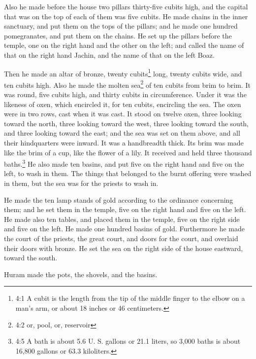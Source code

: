 \myverse{}Also he made before the house two pillars thirty-five cubits
high, and the capital that was on the top of each of them was five cubits.
\myverse{}He made chains in the inner sanctuary, and put them on the tops of the pillars;
and he made one hundred pomegranates, and put them on the chains.
\myverse{}He set up the pillars before the temple, one on the right hand and the other
on the left; and called the name of that on the right hand Jachin, and the name of that on the left Boaz.


\mychapter{} \myverse*{}Then he made an altar of bronze, twenty cubits\footnote{4:1 A cubit is the length from the tip of the middle finger to the elbow on a man’s arm, or about
	18 inches or 46 centimeters.} long, twenty cubits wide, and ten cubits high.
\myverse{}Also he made the molten sea\footnote{4:2 or, pool, or, reservoir} of ten cubits from brim to brim. It was round, five cubits high,
and thirty cubits in circumference.
\myverse{}Under it was the likeness of oxen, which encircled it, for ten cubits, encircling
the sea. The oxen were in two rows, cast when it was cast.
\myverse{}It stood on twelve oxen, three looking toward the north, three looking toward
the west, three looking toward the south, and three looking toward the east; and the sea was set on them
above, and all their hindquarters were inward.
\myverse{}It was a handbreadth thick. Its brim was made like the brim of a cup, like the
flower of a lily. It received and held three thousand baths.\footnote{4:5 A bath is about 5.6 U. S. gallons or 21.1 liters, so 3,000 baths is about 16,800 gallons or 63.3
	kiloliters.}
\myverse{}He also made ten basins, and put five on the right hand and five on the left,
to wash in them. The things that belonged to the burnt offering were washed in them, but the sea was for
the priests to wash in.

\myverse{}He made the ten lamp stands of gold according to the ordinance
concerning them; and he set them in the temple, five on the right hand and five on the left.
\myverse{}He made also ten tables, and placed them in the temple, five on the right side
and five on the left. He made one hundred basins of gold.
\myverse{}Furthermore he made the court of the priests, the great court, and doors for
the court, and overlaid their doors with bronze.
\myverse{}He set the sea on the right side of the house eastward, toward the south.

\myverse{}Huram made the pots, the shovels, and the basins.

